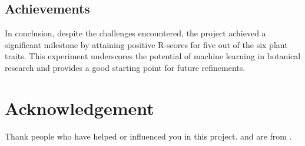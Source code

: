 \documentclass{article}
\begin{document}
\subsection{Achievements}

In conclusion, despite the challenges encountered, the project achieved a significant milestone by attaining positive R-scores for five out of the six plant traits. This experiment underscores the potential of machine learning in botanical research and provides a good starting point for future refinements.





\newpage

\section*{Acknowledgement}
Thank people who have helped or influenced you in this project.  and  are from \citet{LuSY24}.

\nocite{*}
\printbibliography[title=References]
\end{document}
